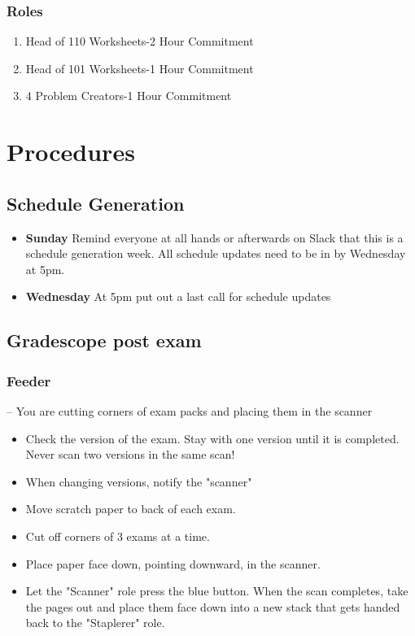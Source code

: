 \documentclass[a4paper]{article}
\begin{document}
\subsubsection{Roles}
\begin{enumerate}
\item Head of 110 Worksheets-2 Hour Commitment
\item Head of 101 Worksheets-1 Hour Commitment
\item 4 Problem Creators-1 Hour Commitment 
\end{enumerate}
\section{Procedures}
\subsection{Schedule Generation}
\begin{itemize}
\item \textbf{Sunday}
Remind everyone at all hands or afterwards on Slack that this is a schedule generation week. All schedule updates need to be in by Wednesday at 5pm.
\item \textbf{Wednesday}
At 5pm put out a last call for schedule updates
\end{itemize}
\subsection{\label{exam_grading}Gradescope post exam}
\subsubsection{Feeder} – You are cutting corners of exam packs and placing them in the scanner
\\
\begin{itemize}
\item Check the version of the exam. Stay with one version until it is completed. Never scan two versions in the same scan!
\item When changing versions, notify the "scanner"
\item Move scratch paper to back of each exam.
\item Cut off corners of 3 exams at a time.
\item Place paper face down, pointing downward, in the scanner.
\item Let the "Scanner" role press the blue button. When the scan completes, take the pages out and place them face down into a new stack that gets handed back to the "Staplerer" role.
\end{itemize}
\end{document}
